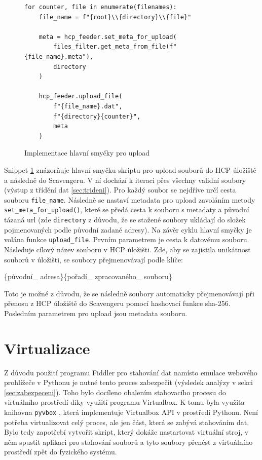 \documentclass[thesis=M,czech,hidelinks]{FITthesis}[2013/05/06]
\begin{document}
\begin{figure}[h]               
	\begin{verbatim}
for counter, file in enumerate(filenames):
    file_name = f"{root}\\{directory}\\{file}"
	
    meta = hcp_feeder.set_meta_for_upload(
        files_filter.get_meta_from_file(f"{file_name}.meta"),
        directory
    )
	
    hcp_feeder.upload_file(
        f"{file_name}.dat",
        f"{directory}{counter}",
        meta
    )
	\end{verbatim}      
	\caption{Implementace hlavní smyčky pro upload}
	\label{snip:mainupload}
\end{figure}

Snippet \ref{snip:mainupload} znázorňuje hlavní smyčku skriptu pro upload souborů do HCP úložiště a následně do Scavengeru. V ní dochází k iteraci přes všechny validní soubory (výstup z třídění dat \ref{sec:trideni}). Pro každý soubor se nejdříve určí cesta souboru \texttt{file_name}. Následně se nastaví metadata pro upload zavoláním metody \texttt{set_meta_for_upload()}, které se předá cesta k souboru s metadaty a původní tázaná url (zde \texttt{directory} z důvodu, že se stažené soubory ukládají do složek pojmenovaných podle původní zadané adresy). Na závěr cyklu hlavní smyčky je volána funkce \texttt{upload_file}. Prvním parametrem je cesta k datovému souboru. Následuje cílový název souboru v HCP úložišti. Zde, aby se zajistila unikátnost souborů v úložišti, se soubory přejmenovávají podle klíče:
\begin{center}\label{prejmenovavani}
\{původní\_ adresa\}\{pořadí\_ zpracovaného\_ souboru\}
\end{center}

 Toto je možné z důvodu, že se následně soubory automaticky přejmenovávají při přenosu z HCP úložiště do Scavengeru pomocí hashovací funkce sha-256. Posledním parametrem pro upload jsou metadata souboru.

\section{Virtualizace}
Z důvodu použití programu Fiddler pro stahování dat namísto emulace webového prohlížeče v Pythonu je nutné tento proces zabezpečit (výsledek analýzy v sekci \ref{sec:zabezpeceni}). Toho bylo docíleno obalením stahovacího procesu do virtuálního prostředí díky využití programu Virtualbox. K tomu byla využita knihovna \texttt{pyvbox} \cite{pyvbox}, která implementuje Virtualbox API v prostředí Pythonu. Není potřeba virtualizovat celý proces, ale jen část, která se zabývá stahováním dat. Bylo tedy zapotřebí vytvořit skript, který dokáže nastartovat virtuální stroj, v něm spustit aplikaci pro stahování souborů a tyto soubory přenést z virtuálního prostředí zpět do fyzického systému.
\end{document}
